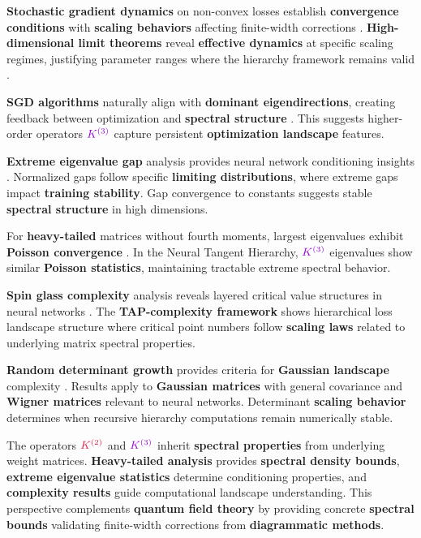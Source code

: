 \documentclass[a4paper]{article}
\theoremstyle{plain}
\theoremstyle{definition}
\theoremstyle{remark}
\begin{document}
\textbf{Stochastic gradient dynamics} on non-convex losses establish \textbf{convergence conditions} with \textbf{scaling behaviors} affecting finite-width corrections \cite{benarous2023high_dimensional_sgd}. \textbf{High-dimensional limit theorems} reveal \textbf{effective dynamics} at specific scaling regimes, justifying parameter ranges where the hierarchy framework remains valid \cite{benarous2023high_dimensional_sgd}.

\textbf{SGD algorithms} naturally align with \textbf{dominant eigendirections}, creating feedback between optimization and \textbf{spectral structure} \cite{benarous2023spectral_sgd_alignment}. This suggests higher-order operators $\textcolor{k3color}{K^{(3)}}$ capture persistent \textbf{optimization landscape} features.

\textbf{Extreme eigenvalue gap} analysis provides neural network conditioning insights \cite{benarous2010gaps}. Normalized gaps follow specific \textbf{limiting distributions}, where extreme gaps impact \textbf{training stability}. Gap convergence to constants suggests stable \textbf{spectral structure} in high dimensions.

For \textbf{heavy-tailed} matrices without fourth moments, largest eigenvalues exhibit \textbf{Poisson convergence} \cite{benarous2009poisson}. In the Neural Tangent Hierarchy, $\textcolor{k3color}{K^{(3)}}$ eigenvalues show similar \textbf{Poisson statistics}, maintaining tractable extreme spectral behavior.

\textbf{Spin glass complexity} analysis reveals layered critical value structures in neural networks \cite{benarous2013complexity}. The \textbf{TAP-complexity framework} shows hierarchical loss landscape structure where critical point numbers follow \textbf{scaling laws} related to underlying matrix spectral properties.

\textbf{Random determinant growth} provides criteria for \textbf{Gaussian landscape} complexity \cite{benarous2021determinants}. Results apply to \textbf{Gaussian matrices} with general covariance and \textbf{Wigner matrices} relevant to neural networks. Determinant \textbf{scaling behavior} determines when recursive hierarchy computations remain numerically stable.

The operators $\textcolor{kernelcolor}{K^{(2)}}$ and $\textcolor{k3color}{K^{(3)}}$ inherit \textbf{spectral properties} from underlying weight matrices. \textbf{Heavy-tailed analysis} provides \textbf{spectral density bounds}, \textbf{extreme eigenvalue statistics} determine conditioning properties, and \textbf{complexity results} guide computational landscape understanding. This perspective complements \textbf{quantum field theory} by providing concrete \textbf{spectral bounds} validating finite-width corrections from \textbf{diagrammatic methods}.
\end{document}
